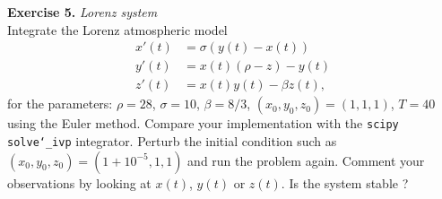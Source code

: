 \documentclass{article}
\begin{document}
\vspace{0.5cm}
\noindent \textbf{Exercise 5.} \textit{Lorenz system} \\
Integrate the Lorenz atmospheric model
\begin{align*}
            x'(t) &= \sigma(y(t)-x(t)) \\
            y'(t) &= x(t)(\rho-z) - y(t) \\
            z'(t) &= x(t)y(t) - \beta z(t),
        \end{align*}
for the parameters: $\rho = 28$, $\sigma=10$, $\beta=8/3$, $(x_0,y_0,z_0) = (1,1,1)$, $T=40$ using the Euler method.
Compare your implementation with the \texttt{scipy solve\char`_ivp} integrator.
Perturb the initial condition such as $(x_0,y_0,z_0) = (1+10^{-5},1,1)$ and run the problem again. Comment your observations by looking at $x(t)$, $y(t)$ or $z(t)$. Is the system stable ?
\end{document}
